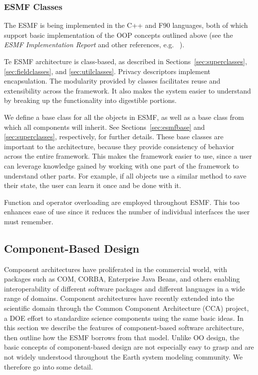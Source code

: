 \subsubsection{ESMF Classes}

The ESMF is being implemented in the C++ and F90 languages, both of which support 
basic implementation of the OOP concepts outlined above (see the {\it ESMF 
Implementation Report} and other references, e.g. ~\cite{Decyk}).  

Te ESMF architecture is class-based, as described in Sections~\ref{sec:superclasses}, 
\ref{sec:fieldclasses}, and \ref{sec:utilclasses}.  Privacy descriptors 
implement encapsulation.  The modularity provided by classes facilitates reuse
and extensibility across the framework.  It also makes the system easier to 
understand by breaking up the functionality into digestible portions.

We define a base class for all the objects in ESMF, as well as a base class 
from which all components will inherit.  See Sections~\ref{sec:esmfbase} and 
\ref{sec:superclasses}, respectively, for further details.  These base
classes are important to the architecture, because they provide consistency
of behavior across the entire framework.  This makes the framework easier
to use, since a user can leverage knowledge gained by working with one
part of the framework to understand other parts.  For example, if all
objects use a similar method to save their state, the user can learn it 
once and be done with it.

Function and operator overloading are employed throughout ESMF.  This too
enhances ease of use since it reduces the number of individual interfaces
the user must remember.  

\subsection{Component-Based Design}

Component architectures have proliferated in the commercial world, with
packages such as COM, CORBA, Enterprise Java Beans, and others enabling 
interoperability
of different software packages and different languages in a wide range
of domains.  Component architectures have recently extended into the 
scientific domain through the Common Component Architecture (CCA) project, a 
DOE effort to standardize science components using the same basic ideas.
In this section we describe the features of component-based software 
architecture, then outline how the ESMF borrows from that model.  Unlike
OO design, the basic concepts of component-based design are not especially
easy to grasp and are not widely understood throughout the Earth system 
modeling community.  We therefore go into some detail.

